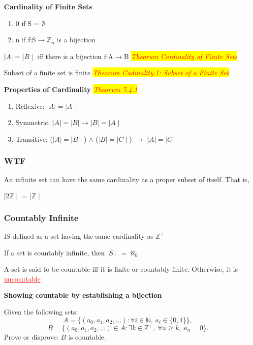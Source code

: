 \documentclass{article}
\newcommand{\theorum}[1]{\quad \quad \colorbox{yellow}{\textit{\textcolor{red}{Theorum #1}}}}
\newcommand{\sub}[1]{\vspace{10pt}\textbf{#1}}
\newcommand{\sbreak}{\vspace{10pt}}
\begin{document}
\sub{Cardinality of Finite Sets}
\begin{enumerate}
    \item 0 if S = $\emptyset$
    \item n if f:S$\rightarrow \mathbb{Z}_n$ is a bijection
\end{enumerate}

$\mid A \mid = \mid B \mid$ iff there is a bijection f:A$\rightarrow$B \theorum{Cardinality of Finite Sets}

Subset of a finite set is finite \theorum{Cadinality.1: Subset of a Finite Set}

\sub{Properties of Cardinality} \theorum{7.4.1}

\begin{enumerate}
    \item Reflexive: $\mid A \mid = \mid A \mid$
    \item Symmetric: $\mid A \mid = \mid B \mid \rightarrow \mid B \mid = \mid A \mid$
    \item Transitive: ($\mid A \mid = \mid B \mid$) $\wedge$ ($\mid B \mid = \mid C \mid$) $\rightarrow$ $\mid A \mid = \mid C \mid$
\end{enumerate}

\subsubsection{WTF}
An infinite set can have the same cardinality as a proper subset of itself. That is,

$\mid 2\mathbb{Z} \mid$ = $\mid \mathbb{Z} \mid$


\subsubsection{Countably Infinite}
IS defined as a set having the same cardinality as $\mathbb{Z}^+$

\sbreak

If a set is countably infinite, then $\mid S \mid$ = $\aleph_0$

A set is said to be countable iff it is finite or countably finite. Otherwise, it is \textcolor{red}{\underline{uncountable}}


\sub{Showing countable by establishing a bijection}

Given the following sets:
\[
A = \{(a_0, a_1, a_2, \dots) : \forall i \in \mathbb{N}, \ a_i \in \{0, 1\}\},
\]
\[
B = \{(a_0, a_1, a_2, \dots) \in A : \exists k \in \mathbb{Z}^+, \ \forall n \geq k, \ a_n = 0\}.
\]
Prove or disprove: \( B \) is countable.
\end{document}
